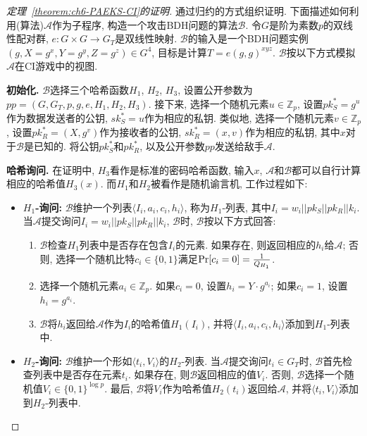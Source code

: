 \begin{proof}[定理~\ref{theorem:ch6-PAEKS-CI}的证明]
通过归约的方式组织证明. 下面描述如何利用(算法)$\mathcal{A}$作为子程序, 构造一个攻击BDH问题的算法$\mathcal{B}$. 令$G$是阶为素数$p$的双线性配对群, $e: G \times G \rightarrow G_T$是双线性映射. $\mathcal{B}$的输入是一个BDH问题实例$(g, X = g^x, Y = g^y, Z = g^z) \in G^4$, 目标是计算$T = e(g, g)^{xyz}$. $\mathcal{B}$按以下方式模拟$\mathcal{A}$在CI游戏中的视图.  

\begin{trivlist}
\item \textbf{初始化.} $\mathcal{B}$选择三个哈希函数$H_1$, $H_2$, $H_3$, 设置公开参数为$pp=(G, G_T, p, g, e, H_1, H_2, H_3)$. 接下来, 选择一个随机元素$u\in\mathbb{Z}_p$, 设置$pk_S^* = g^u$作为数据发送者的公钥, $sk_S^* = u$作为相应的私钥. 类似地, 选择一个随机元素$v \in \mathbb{Z}_p$, 设置$pk_R^*=(X, g^v)$作为接收者的公钥, $sk_R^* = (x, v)$作为相应的私钥, 其中$x$对于$\mathcal{B}$是已知的. 将公钥$pk_S^*$和$pk_R^*$, 以及公开参数$pp$发送给敌手$\mathcal{A}$.

\item \textbf{哈希询问.} 在证明中, $H_3$看作是标准的密码哈希函数, 输入$x$, $\mathcal{A}$和$\mathcal{B}$都可以自行计算相应的哈希值$H_3(x)$. 而$H_1$和$H_2$被看作是随机谕言机, 工作过程如下:
\begin{itemize}
\item \textbf{$H_1$-询问:} $\mathcal{B}$维护一个列表$\langle I_i, a_i, c_i, h_i\rangle$, 称为$H_1$-列表, 其中$I_i = w_i||pk_S||pk_R||k_i$. 当$\mathcal{A}$提交询问$I_i=w_i||pk_S||pk_R||k_i$, $\mathcal{B}$时, $\mathcal{B}$按以下方式回答:
\begin{enumerate}
\item $\mathcal{B}$检查$H_1$列表中是否存在包含$I_i$的元素. 如果存在, 则返回相应的$h_i$给$\mathcal{A}$; 否则, 选择一个随机比特$c_i \in \{0, 1\}$满足$\textup{Pr}[c_i = 0] = \frac{1}{Q_{H_1}}$.
\item 选择一个随机元素$a_i \in \mathbb{Z}_p$. 如果$c_i = 0$, 设置$h_i = Y \cdot g^{a_i}$; 如果$c_i = 1$, 设置$h_i = g^{a_i}$.
\item $\mathcal{B}$将$h_i$返回给$\mathcal{A}$作为$I_i$的哈希值$H_1(I_i)$, 并将$\langle I_i, a_i, c_i, h_i\rangle$添加到$H_1$-列表中.
\end{enumerate} 

\item \textbf{$H_2$-询问:} $\mathcal{B}$维护一个形如$\langle t_i, V_i \rangle$的$H_2$-列表. 当$\mathcal{A}$提交询问$t_i\in G_T$时, $\mathcal{B}$首先检查列表中是否存在元素$t_i$. 如果存在, 则$\mathcal{B}$返回相应的值$V_i$. 否则, $\mathcal{B}$选择一个随机值$V_i \in \{0, 1\}^{\log p}$. 最后, $\mathcal{B}$将$V_i$作为哈希值$H_2(t_i)$返回给$\mathcal{A}$, 并将$\langle t_i, V_i\rangle$添加到$H_2$-列表中.
\end{itemize}


\end{trivlist}
\end{proof}

